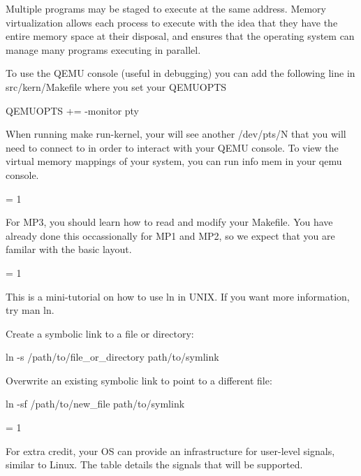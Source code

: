 \documentclass{article}
\begin{document}
Multiple programs may be staged to execute at the same address. Memory virtualization allows each process to
execute with the idea that they have the entire memory space at their disposal, and ensures that the operating
system can manage many programs executing in parallel.

To use the QEMU console (useful in debugging) you can add the following line in {\fix src/kern/Makefile}
where you set your {\fix QEMUOPTS}

\begin{center} 
	{{\fix QEMUOPTS += -monitor pty}}
\end{center}

When running {\fix make run-kernel}, your will see another {\fix /dev/pts/N} that you will need to connect to
in order to interact with your QEMU console. To view the virtual memory mappings of your system, you can run {\fix info mem} in your qemu console.
\vfill

\pagebreak

\else
\fi

\ifnum\renderappE = 1

For MP3, you should learn how to read and modify your {\fix Makefile}. You have already done this occassionally 
for MP1 and MP2, so we expect that you are familar with the basic layout.

\vfill
\pagebreak
\else
\fi

\ifnum\renderappF = 1


This is a mini-tutorial on how to use {\fix ln} in UNIX. If you want more information, try {\fix man ln}.

Create a symbolic link to a file or directory:

{\fix ln -s /path/to/file\_or\_directory path/to/symlink}

Overwrite an existing symbolic link to point to a different file:

{\fix ln -sf /path/to/new\_file path/to/symlink}

\else
\fi

\ifnum\renderappG = 1


For extra credit,
your OS can provide an infrastructure for user-level signals, similar to
Linux.  The table details the signals that will be supported.
\end{document}
